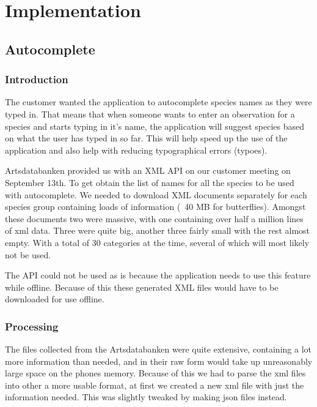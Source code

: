 \section{Implementation}

\subsection{Autocomplete}

	\subsubsection{Introduction}
	The customer wanted the application to autocomplete species names as they were typed in. 
	That means that when someone wants to enter an observation for a species and starts typing in it's name, the application will suggest species based on what the user has typed in so far. 
	This will help speed up the use of the application and also help with reducing typographical errors (typoes).

	Artsdatabanken provided us with an XML API on our customer meeting on September 13th. 
	To get obtain the list of names for all the species to be used with autocomplete. 
	We needed to download XML documents separately for each species group containing loads of information (~40 MB for butterflies).
	Amongst these documents two were massive, with one containing over half a million lines of xml data. 
	Three were quite big, another three fairly small with the rest almost empty. With a total of 30 categories at the time, several of which will most likely not be used.

	The API could not be used as is because the application needs to use this feature while offline. Because of this these generated XML files would have to be downloaded for use offline.

	\subsubsection{Processing}
	The files collected from the Artsdatabanken were quite extensive, containing a lot more information than needed, and in their raw form would take up unreasonably large space on the phones memory. 
	Because of this we had to parse the xml files into other a more usable format, at first we created a new xml file with just the information needed. 
	This was slightly tweaked by making json files instead.

